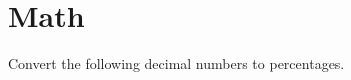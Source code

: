 \documentclass[12pt,letter]{exam}
\begin{document}
\section{Math}
\begin{questions}
    \question Convert the following decimal numbers to percentages.
    \begin{solution}
\end{solution}
\end{questions}
\end{document}
